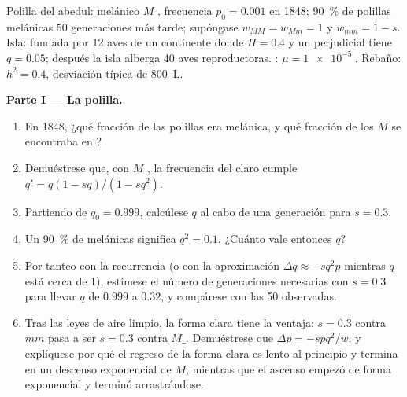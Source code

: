 \begin{problem}
\label{pb:b2:population-genetics:1}
Polilla del abedul:  melánico $M$ , frecuencia $p_0 = 0.001$
en 1848; \qty{90}{\%} de polillas melánicas 50 generaciones más tarde;
supóngase
$w_{MM} = w_{Mm} = 1$ y $w_{mm} = 1 - s$. Isla: fundada por 12 aves de un
continente donde $H = 0.4$ y un   perjudicial tiene
$q = 0.05$; después la isla alberga 40 aves reproductoras. :
$\mu = \qty{1e-5}{}$. Rebaño: $h^{2} = 0.4$, desviación típica de
\qty{800}{L}.

\medskip
\noindent\textbf{Parte I --- La polilla.}
\begin{enumerate}
  \item En 1848, ¿qué fracción de las polillas era melánica, y qué
        fracción de los  $M$ se encontraba en ?
  \item Demuéstrese que, con $M$ , la frecuencia del  claro
        cumple $q' = q(1 - sq)/(1 - sq^{2})$.
  \item Partiendo de $q_0 = 0.999$, calcúlese $q$ al cabo de una generación
        para $s = 0.3$.
  \item Un \qty{90}{\%} de melánicas significa $q^{2} = 0.1$. ¿Cuánto vale
        entonces $q$?
  \item Por tanteo con la recurrencia (o con la aproximación
        $\Delta q \approx -sq^{2}p$ mientras $q$ está cerca de 1), estímese
        el número de generaciones necesarias con $s = 0.3$ para llevar $q$
        de $0.999$ a $0.32$, y compárese con las 50 observadas.
  \item Tras las leyes de aire limpio, la forma clara tiene la ventaja: $s
        = 0.3$ contra $mm$ pasa a ser $s = 0.3$ contra $M\_$. Demuéstrese
        que $\Delta p = -spq^{2}/\bar w$, y explíquese por qué el regreso
        de la forma clara es lento al principio y termina en un descenso
        exponencial de $M$, mientras que el ascenso empezó de forma
        exponencial y terminó arrastrándose.
\end{enumerate}


\end{problem}
